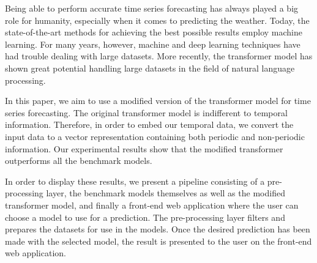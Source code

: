 Being able to perform accurate time series forecasting has always played a big role for humanity, especially when it comes to predicting the weather. 
Today, the state-of-the-art methods for achieving the best possible results employ machine learning. 
For many years, however, machine and deep learning techniques have had trouble dealing with large datasets. 
More recently, the transformer model has shown great potential handling large datasets in the field of natural language processing.

In this paper, we aim to use a modified version of the transformer model for time series forecasting. 
The original transformer model is indifferent to temporal information. 
Therefore, in order to embed our temporal data, we convert the input data to a vector representation containing both periodic and non-periodic information.
Our experimental results show that the modified transformer outperforms all the benchmark models.

In order to display these results, we present a pipeline consisting of a pre-processing layer, the benchmark models themselves as well as the modified transformer model, and finally a front-end web application where the user can choose a model to use for a prediction.
The pre-processing layer filters and prepares the datasets for use in the models.
Once the desired prediction has been made with the selected model, the result is presented to the user on the front-end web application.